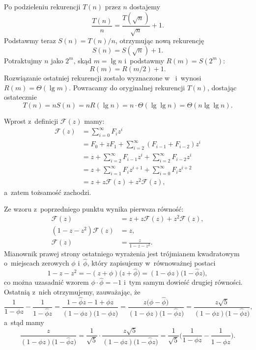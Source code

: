 \subproblem %
Po podzieleniu rekurencji $T(n)$ przez $n$ dostajemy
\[
	\frac{T(n)}{n} = \frac{T(\!\sqrt{n})}{\sqrt{n}}+1.
\]
Podstawmy teraz $S(n)=T(n)/n$, otrzymując nową rekurencję
\[
	S(n) = S(\!\sqrt{n})+1.
\]
Potraktujmy $n$ jako $2^m$, skąd $m=\lg n$ i~podstawmy $R(m)=S(2^m)$:
\[
	R(m) = R(m/2)+1.
\]
Rozwiązanie ostatniej rekurencji zostało wyznaczone w~ i~wynosi $R(m)=\Theta(\lg m)$. Powracamy do oryginalnej rekurencji $T(n)$, dostając ostatecznie
\[
	T(n) = nS(n) = nR(\lg n) = n\cdot\Theta(\lg\lg n) = \Theta(n\lg\lg n).
\]


\subproblem %
Wprost z~definicji $\mathcal{F}(z)$ mamy:
\begin{align*}
	\mathcal{F}(z) &= \sum_{i=0}^\infty F_iz^i \\
	&= F_0+zF_1+\sum_{i=2}^\infty (F_{i-1}+F_{i-2})z^i \\
	&= z+\sum_{i=2}^\infty F_{i-1}z^i+\sum_{i=2}^\infty F_{i-2}z^i \\
	&= z+\sum_{i=1}^\infty F_iz^{i+1}+\sum_{i=0}^\infty F_iz^{i+2} \\[2mm]
	&= z+z\mathcal{F}(z)+z^2\mathcal{F}(z),
\end{align*}
a~zatem tożsamość zachodzi.

\subproblem %
Ze wzoru z~poprzedniego punktu wynika pierwsza równość:
\begin{align*}
	\mathcal{F}(z) &= z+z\mathcal{F}(z)+z^2\mathcal{F}(z), \\
	(1-z-z^2)\mathcal{F}(z) &= z, \\
	\mathcal{F}(z) &= \frac{z}{1-z-z^2}.
\end{align*}
Mianownik prawej strony ostatniego wyrażenia jest trójmianem kwadratowym o~miejscach zerowych $\phi$ i~$\widehat\phi$, który zapisujemy w~równoważnej postaci
\[
	1-z-z^2 = -(z+\phi)\bigl(z+\widehat\phi\bigr) = (1-\phi z)\bigl(1-\widehat\phi z\bigr),
\]
co można uzasadnić wzorem $\phi\cdot\widehat\phi=-1$ i~tym samym dowieść drugiej równości. Ostatnią z~nich otrzymujemy, zauważając, że
\[
	\frac{1}{1-\phi z}-\frac{1}{1-\widehat\phi z} = \frac{1-\widehat\phi z-1+\phi z}{(1-\phi z)\bigl(1-\widehat\phi z\bigr)} = \frac{z\bigl(\phi-\widehat\phi\bigr)}{(1-\phi z)\bigl(1-\widehat\phi z\bigr)} = \frac{z\sqrt{5}}{(1-\phi z)\bigl(1-\widehat\phi z\bigr)},
\]
a~stąd mamy
\[
	\frac{z}{(1-\phi z)\bigl(1-\widehat\phi z\bigr)} = \frac{1}{\sqrt{5}}\cdot\frac{z\sqrt{5}}{(1-\phi z)\bigl(1-\widehat\phi z\bigr)} = \frac{1}{\sqrt{5}}\biggl(\frac{1}{1-\phi z}-\frac{1}{1-\widehat\phi z}\biggr).
\]

